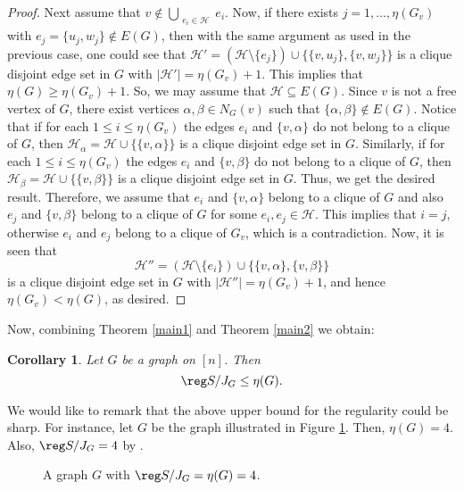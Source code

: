 \documentclass[12pt]{amsart}
\newtheorem{Corollary}[Theorem]{Corollary}
\begin{document}
\begin{proof}
\par Next assume that $v\notin \bigcup \limits_{\substack{e_i \in \mathcal{H}}}e_i$. Now, if there exists $j=1,\ldots,\eta(G_v)$ with $e_j=\{u_j,w_j\}\notin E(G)$, then with the same argument as used in the previous case, one could see that $\mathcal{H'}=(\mathcal{H}\setminus\{e_j\})\cup\{\{v,u_j\},\{v,w_j\}\}$ is a clique disjoint edge set in $G$ with $|\mathcal{H'}|=\eta(G_v)+1$. This implies that $\eta(G)\geq \eta(G_v)+1$. So, we may assume that $\mathcal{H}\subseteq E(G)$. Since  $v$ is not a free vertex of $G$, there exist vertices $\alpha,\beta \in N_G(v)$ such that $\{\alpha,\beta\}\notin E(G)$.  Notice that if for each $1\leq i \leq \eta(G_v)$ the edges $e_i$ and $\{v,\alpha\}$ do not belong to a clique of $G$, then $\mathcal{H}_{\alpha}=\mathcal{H}\cup \{\{v,\alpha\}\}$ is a clique disjoint edge set in $G$. Similarly, if for each $1\leq i \leq \eta(G_v)$ the edges $e_i$ and $\{v,\beta\}$ do not belong to a clique of $G$, then $\mathcal{H}_{\beta}=\mathcal{H}\cup \{\{v,\beta\}\}$ is a clique disjoint edge set in $G$. Thus, we get the desired result. Therefore, we assume that $e_i$ and $\{v,\alpha\}$ belong to a clique of $G$ and also $e_j$ and $\{v,\beta\}$ belong to a clique of $G$ for some $e_i,e_j\in \mathcal{H}$. This implies that $i=j$, otherwise $e_i$ and $e_j$ belong to a clique of $G_v$, which is a contradiction. Now, it is seen that 
$$\mathcal{H''}=(\mathcal{H}\setminus\{e_i\})\cup\{\{v,\alpha\},\{v,\beta\}\}$$
is a clique disjoint edge set in $G$ with $|\mathcal{H''}|=\eta(G_v)+1$, and hence $\eta(G_v)<\eta(G)$, as desired.
\end{proof}
\par Now, combining Theorem \ref{main1} and Theorem \ref{main2} we obtain: 
\begin{Corollary}\label{eta}
Let $G$ be a graph on $[n]$. Then 
$$\reg S/J_G\leq \eta(G).$$
\end{Corollary}

We would like to remark that the above upper bound for the regularity could be sharp. For instance, let $G$ be the graph illustrated in Figure \ref{sharp1}. Then, $\eta(G)=4$. Also, $\reg S/J_G=4$ by  \cite[Proposition~3.8]{KS}.

\begin{figure}[H]
\centering
{}
\vspace{3mm}
\caption{A graph $G$ with $\reg S/J_G=\eta(G)=4$.}
\label{sharp1}
\end{figure}
\end{document}
